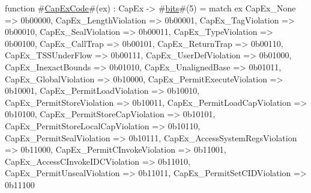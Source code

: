 function #\hyperref[sailRISCVzCapExCode]{CapExCode}#(ex) : CapEx -> #\hyperref[sailRISCVzbits]{bits}#(5) =
  match ex {
    CapEx_None                          => 0b00000,
    CapEx_LengthViolation               => 0b00001,
    CapEx_TagViolation                  => 0b00010,
    CapEx_SealViolation                 => 0b00011,
    CapEx_TypeViolation                 => 0b00100,
    CapEx_CallTrap                      => 0b00101,
    CapEx_ReturnTrap                    => 0b00110,
    CapEx_TSSUnderFlow                  => 0b00111,
    CapEx_UserDefViolation              => 0b01000,
    CapEx_InexactBounds                 => 0b01010,
    CapEx_UnalignedBase                 => 0b01011,
    CapEx_GlobalViolation               => 0b10000,
    CapEx_PermitExecuteViolation        => 0b10001,
    CapEx_PermitLoadViolation           => 0b10010,
    CapEx_PermitStoreViolation          => 0b10011,
    CapEx_PermitLoadCapViolation        => 0b10100,
    CapEx_PermitStoreCapViolation       => 0b10101,
    CapEx_PermitStoreLocalCapViolation  => 0b10110,
    CapEx_PermitSealViolation           => 0b10111,
    CapEx_AccessSystemRegsViolation     => 0b11000,
    CapEx_PermitCInvokeViolation        => 0b11001,
    CapEx_AccessCInvokeIDCViolation     => 0b11010,
    CapEx_PermitUnsealViolation         => 0b11011,
    CapEx_PermitSetCIDViolation         => 0b11100
  }
